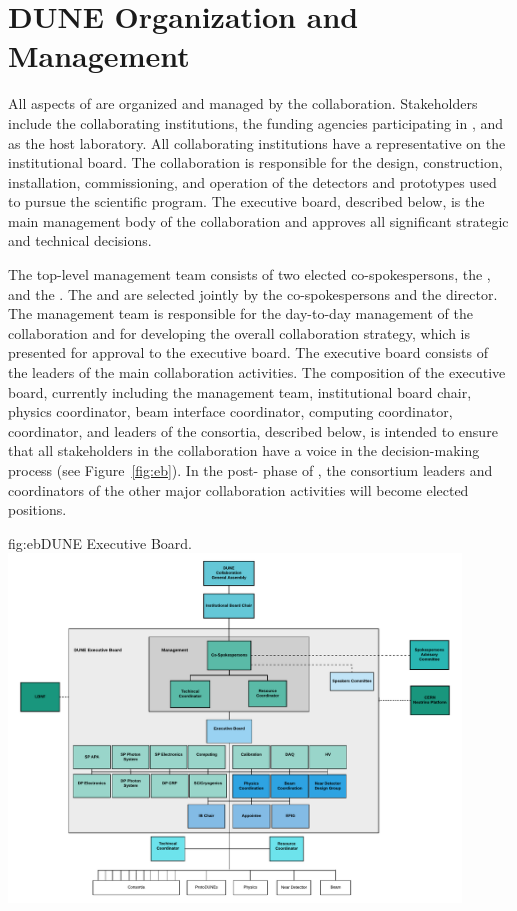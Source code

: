 \section{DUNE Organization and Management}

All aspects of  are organized and managed by the  collaboration.  Stakeholders include the collaborating institutions, the funding agencies participating in , and  as the host laboratory.  All collaborating institutions have a representative on the  institutional board. The collaboration is responsible for the design, construction, installation, commissioning, and operation of the detectors and prototypes used to pursue the scientific program. The  executive board, described below, is the main management body of the collaboration and approves all significant strategic and technical decisions.

The top-level  management team consists of two elected co-spokespersons, the , and the . The  and  are selected jointly by the co-spokespersons and the  director. The management team is responsible for the day-to-day management of the collaboration and for developing the overall collaboration strategy, which is presented for approval to the executive board. The executive board consists of the leaders of the main collaboration activities. The composition of the executive board, currently including the  management team, institutional board chair, physics coordinator, beam interface coordinator, computing coordinator,  coordinator, and leaders of the  consortia, described below, is intended to ensure
that all stakeholders in the collaboration have a voice in the decision-making process (see Figure~\ref{fig:eb}). 
In the post- phase of , the consortium leaders and coordinators of the other major collaboration activities will become elected positions.

\begin{dunefigure}	
{fig:eb}{DUNE Executive Board.}
\includegraphics[width=0.9\textwidth]{graphics/eb.pdf}
\end{dunefigure}

